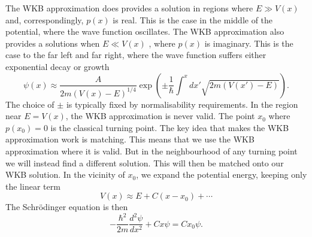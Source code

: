 The WKB approximation does provides a solution in regions where $E \gg V(x)$ and, correspondingly, $p(x)$ is real. This is the case in the middle of the potential, where
the wave function oscillates. 
The WKB approximation also provides a solutions when
$E \ll V(x)$ , where $p(x)$ is imaginary. This is the case to the far left and far right, where the wave function suffers either exponential decay or growth
\[\psi(x) \approx \frac{A}{2m(V(x)-E)^{1/4}} \exp \left( \pm \frac{1}{\hbar} \int^x dx' \sqrt{2m(V(x') - E)}\right) .\]
The choice of $\pm$ is typically fixed by normalisability requirements.
In the region near $E = V(x)$, the WKB approximation is never valid. 
The point $x_0$ where $p(x_0) = 0$ is the classical turning point.
The key idea that makes the WKB approximation work is matching. This means that we use the WKB approximation where it is valid. But in the neighbourhood of any turning point we will instead find a different solution. This will then be matched onto our WKB solution.
In the vicinity of $x_0$, we expand the potential energy, keeping only the linear term
\[V(x) \approx E + C(x-x_0) + \cdots\]
The Schr\"{o}dinger equation is then
\[-\frac{\hbar^2}{2m} \frac{d^2\psi}{dx^2} + Cx\psi = Cx_0 \psi.\]

